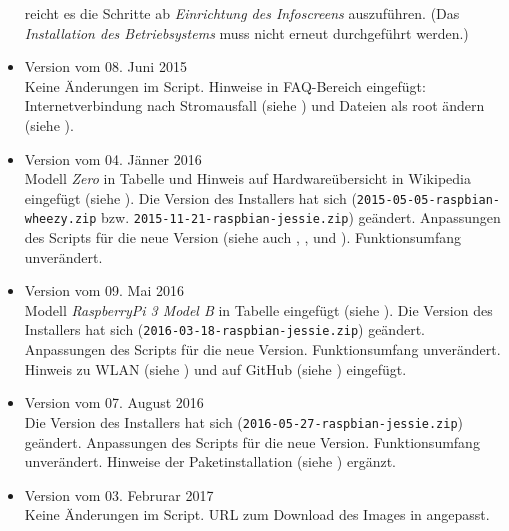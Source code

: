 \begin{itemize}
{		reicht es die Schritte ab  \textit{Einrichtung des Infoscreens} auszuführen.
		(Das  \textit{Installation des Betriebsystems} muss nicht erneut durchgeführt werden.)
		}
	\item {Version vom 08. Juni 2015\\ Keine Änderungen im Script.
		Hinweise in FAQ-Bereich eingefügt: Internetverbindung nach Stromausfall (siehe ) und Dateien als root ändern (siehe ).
 		}
	\item {Version vom 04. Jänner 2016\\ 
		Modell \textit{Zero} in Tabelle und Hinweis auf Hardwareübersicht in Wikipedia eingefügt (siehe ).
		Die Version des Installers hat sich (\lstinline|2015-05-05-raspbian-wheezy.zip| bzw. \lstinline|2015-11-21-raspbian-jessie.zip|) geändert. 
		Anpassungen des Scripts für die neue Version (siehe auch , ,  und ).
		Funktionsumfang unverändert.
 		}
	\item {Version vom 09. Mai 2016\\ 
		Modell \textit{RaspberryPi 3 Model B} in Tabelle eingefügt (siehe ).
		Die Version des Installers hat sich (\lstinline|2016-03-18-raspbian-jessie.zip|) geändert. 
		Anpassungen des Scripts für die neue Version.
		Funktionsumfang unverändert.
		Hinweis zu WLAN (siehe ) und auf GitHub (siehe ) eingefügt.
 		}
	\item {Version vom 07. August 2016\\ 
		Die Version des Installers hat sich (\lstinline|2016-05-27-raspbian-jessie.zip|) geändert. 
		Anpassungen des Scripts für die neue Version.
		Funktionsumfang unverändert.
		Hinweise der Paketinstallation (siehe ) ergänzt.
 		}
	\item {Version vom 03. Februrar 2017\\ Keine Änderungen im Script.
		URL zum Download des Images in  angepasst.
 		}
\end{itemize}

